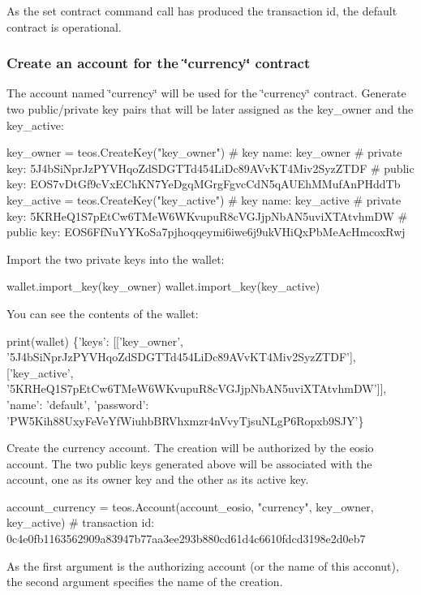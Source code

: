 As the set contract command call has produced the transaction id, the default contract is operational.

\subsubsection*{Create an account for the \char`\"{}currency\char`\"{} contract}

The account named \char`\"{}currency\char`\"{} will be used for the \char`\"{}currency\char`\"{} contract. Generate two public/private key pairs that will be later assigned as the key\+\_\+owner and the key\+\_\+active\+: 
\begin{DoxyCode}
key\_owner = teos.CreateKey("key\_owner")
#              key name: key\_owner
#           private key: 5J4bSiNprJzPYVHqoZdSDGTTd454LiDc89AVvKT4Miv2SyzZTDF
#            public key: EOS7vDtGf9cVxEChKN7YeDgqMGrgFgvcCdN5qAUEhMMufAnPHddTb
key\_active = teos.CreateKey("key\_active")
#              key name: key\_active
#           private key: 5KRHeQ1S7pEtCw6TMeW6WKvupuR8cVGJjpNbAN5uviXTAtvhmDW
#            public key: EOS6FfNuYYKoSa7pjhoqqeymi6iwe6j9ukVHiQxPbMeAcHmcoxRwj
\end{DoxyCode}
 Import the two private keys into the wallet\+:

wallet.\+import\+\_\+key(key\+\_\+owner) wallet.\+import\+\_\+key(key\+\_\+active)

You can see the contents of the wallet\+: 
\begin{DoxyCode}
print(wallet)
\{'keys': [['key\_owner', '5J4bSiNprJzPYVHqoZdSDGTTd454LiDc89AVvKT4Miv2SyzZTDF'],
          ['key\_active',
           '5KRHeQ1S7pEtCw6TMeW6WKvupuR8cVGJjpNbAN5uviXTAtvhmDW']],
 'name': 'default',
 'password': 'PW5Kih88UxyFeVeYfWiuhbBRVhxmzr4nVvyTjsuNLgP6Ropxb9SJY'\}
\end{DoxyCode}
 Create the currency account. The creation will be authorized by the eosio account. The two public keys generated above will be associated with the account, one as its owner key and the other as its active key. 
\begin{DoxyCode}
account\_currency = teos.Account(account\_eosio, "currency", key\_owner, key\_active)
#        transaction id: 0c4e0fb1163562909a83947b77aa3ee293b880cd61d4c6610fdcd3198e2d0eb7
\end{DoxyCode}
 As the first argument is the authorizing account (or the name of this acconut), the second argument specifies the name of the creation.

